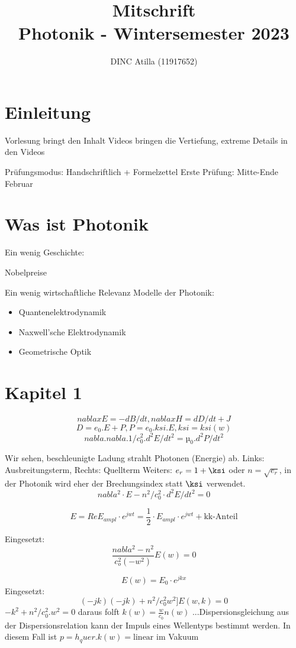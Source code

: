 \documentclass[a4paper]{article}
\title{Mitschrift\\Photonik - Wintersemester 2023}
\author{DINC Atilla (11917652)}
\begin{document}
\normalsize
\maketitle
\tableofcontent\newpage


\section*{Einleitung}
Vorlesung bringt den Inhalt
Videos bringen die Vertiefung, extreme Details in den Videos

Prüfungsmodus:
Handschriftlich + Formelzettel
Erste Prüfung: Mitte-Ende Februar

\section*{Was ist Photonik}
Ein wenig Geschichte:
\item Nobelpreise

Ein wenig wirtschaftliche Relevanz
Modelle der Photonik:
\begin{itemize}
    \item Quantenelektrodynamik
    \item Naxwell'sche Elektrodynamik
    \item Geometrische Optik
\end{itemize}

\section*{Kapitel 1}
\[ nablaxE=-dB/dt ,   nablaxH=dD/dt + J \]
\[ D=e_0.E+P, P=e_0.ksi.E, ksi=ksi(w) \]
\[ nabla.nabla.1/c_0^2.d^2E/dt^2 = µ_0.d^2P/dt^2 \]

Wir sehen, beschleunigte Ladung strahlt Photonen (Energie) ab.
Links: Ausbreitungsterm, Rechts: Quellterm
Weiters: $e_r=1+\ksi$ oder $n=\sqrt{e_r}$, in der Photonik wird eher der Brechungsindex statt $\ksi$ verwendet.
\[ nabla^2\cdot E-n^2/c_0^2\cdot d^2E/dt^2=0 \]

\[ E=Re{E_{ampl}\cdot e^{jwt}}=\frac{1}{2}\cdot E_{ampl}\cdot e^{jwt} + \text{kk-Anteil} \]

Eingesetzt:
\[ \frac{nabla^2-n^2}{c_o^2(-w^2)}E(w)=0 \]


\[ E(w)=E_0\cdot e^{jkx} \]
Eingesetzt:
\[ (-jk)(-jk)+n^2/c_0^2w^2]E(w,k)=0 \]
$-k^2+n^2/c_0^2.w^2=0 $ daraus folft $k(w)=\frac{w}{c_0}n(w) $ ...Dispersionsgleichung
aus der Dispersionsrelation kann der Impuls eines Wellentyps bestimmt werden. In diesem Fall ist $p=h_quer.k(w)=\text{linear}$ im Vakuum
\end{document}
